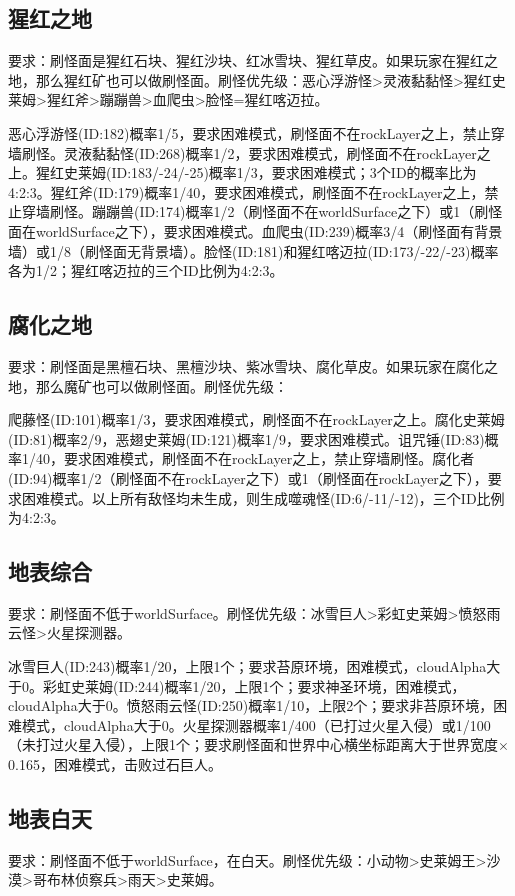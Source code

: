 \subsection{猩红之地}
要求：刷怪面是猩红石块、猩红沙块、红冰雪块、猩红草皮。如果玩家在猩红之地，那么猩红矿也可以做刷怪面。刷怪优先级：恶心浮游怪>灵液黏黏怪>猩红史莱姆>猩红斧>蹦蹦兽>血爬虫>脸怪=猩红喀迈拉。

恶心浮游怪(ID:182)概率1/5，要求困难模式，刷怪面不在rockLayer之上，禁止穿墙刷怪。灵液黏黏怪(ID:268)概率1/2，要求困难模式，刷怪面不在rockLayer之上。猩红史莱姆(ID:183/-24/-25)概率1/3，要求困难模式；3个ID的概率比为4:2:3。猩红斧(ID:179)概率1/40，要求困难模式，刷怪面不在rockLayer之上，禁止穿墙刷怪。蹦蹦兽(ID:174)概率1/2（刷怪面不在worldSurface之下）或1（刷怪面在worldSurface之下），要求困难模式。血爬虫(ID:239)概率3/4（刷怪面有背景墙）或1/8（刷怪面无背景墙）。脸怪(ID:181)和猩红喀迈拉(ID:173/-22/-23)概率各为1/2；猩红喀迈拉的三个ID比例为4:2:3。

\subsection{腐化之地}
要求：刷怪面是黑檀石块、黑檀沙块、紫冰雪块、腐化草皮。如果玩家在腐化之地，那么魔矿也可以做刷怪面。刷怪优先级：

爬藤怪(ID:101)概率1/3，要求困难模式，刷怪面不在rockLayer之上。腐化史莱姆(ID:81)概率2/9，恶翅史莱姆(ID:121)概率1/9，要求困难模式。诅咒锤(ID:83)概率1/40，要求困难模式，刷怪面不在rockLayer之上，禁止穿墙刷怪。腐化者(ID:94)概率1/2（刷怪面不在rockLayer之下）或1（刷怪面在rockLayer之下），要求困难模式。以上所有敌怪均未生成，则生成噬魂怪(ID:6/-11/-12)，三个ID比例为4:2:3。

\subsection{地表综合}
要求：刷怪面不低于worldSurface。刷怪优先级：冰雪巨人>彩虹史莱姆>愤怒雨云怪>火星探测器。

冰雪巨人(ID:243)概率1/20，上限1个；要求苔原环境，困难模式，cloudAlpha大于0。彩虹史莱姆(ID:244)概率1/20，上限1个；要求神圣环境，困难模式，cloudAlpha大于0。愤怒雨云怪(ID:250)概率1/10，上限2个；要求非苔原环境，困难模式，cloudAlpha大于0。火星探测器概率1/400（已打过火星入侵）或1/100（未打过火星入侵），上限1个；要求刷怪面和世界中心横坐标距离大于世界宽度$\times$0.165，困难模式，击败过石巨人。

\subsection{地表白天}
要求：刷怪面不低于worldSurface，在白天。刷怪优先级：小动物>史莱姆王>沙漠>哥布林侦察兵>雨天>史莱姆。

